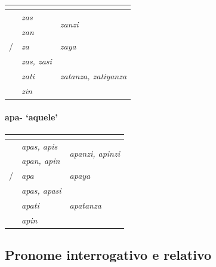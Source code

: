 \begin{center}
	\begin{tabular}[c]{lll}
		\toprule
		                 & \Sg{}\emph{}     & \Pl{}\emph{}                    \\
		\midrule
		\Nom{} \Com{}    & \emph{zas}       & \multirow{2}{4em}{\emph{zanzi}} \\
		\Acu{} \Com{}    & \emph{zan}       &                                 \\
		\Nom/\Acu\Neut{} & \emph{za}        & \emph{zaya}                     \\
		\Gen{}           & \emph{zas, zasi} &                                 \\
		\Dat{}           & \emph{zati}      & \emph{zatanza, zatiyanza}       \\
		\Abl{}           & \emph{zin}       & \emph{}                         \\
		\bottomrule
	\end{tabular}
\end{center}

\clearpage
\paragraph{apa- `aquele'}

\begin{center}
	\begin{tabular}[c]{lll}
		\toprule
		                 & \Sg{}\emph{}       & \Pl{}\emph{}                             \\
		\midrule
		\Nom{} \Com{}    & \emph{apas, apis}  & \multirow{2}{4em}{\emph{apanzi, apinzi}} \\
		\Acu{} \Com{}    & \emph{apan, apin}  &                                          \\
		\Nom/\Acu\Neut{} & \emph{apa}         & \emph{apaya}                             \\
		\Gen{}           & \emph{apas, apasi} &                                          \\
		\Dat{}           & \emph{apati}       & \emph{apatanza}                          \\
		\Abl{}           & \emph{apin}        & \emph{}                                  \\
		\bottomrule
	\end{tabular}
\end{center}

\subsection{Pronome interrogativo e relativo}

